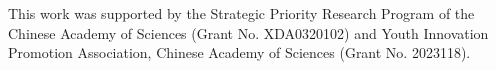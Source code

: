 \documentclass[sigconf,screen,review]{acmart}
\begin{document}
\begin{acks}
  This work was supported by the Strategic Priority Research Program of the Chinese Academy of Sciences (Grant No. XDA0320102) and Youth Innovation Promotion Association, Chinese Academy of Sciences (Grant No. 2023118).
\end{acks}



\end{document}
